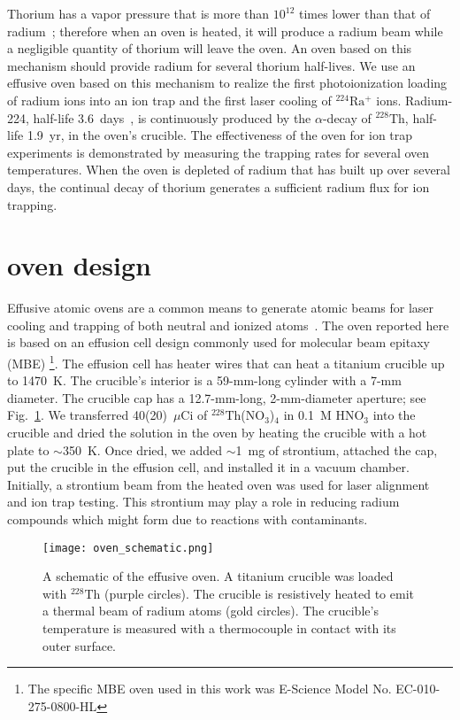 \documentclass[
 reprint,
 amsmath,amssymb,
 aps,
 prr,
 superscriptaddress,
]{revtex4-2}
\newcommand{\iso}[2]{\ensuremath{^{#2}\mathrm{#1}}}
\begin{document}
Thorium has a vapor pressure that is more than $10^{12}$ times lower than that of radium~\cite{haynes2015}; therefore when an oven is heated, it will produce a radium beam while a negligible quantity of thorium will leave the oven. An oven based on this mechanism should provide radium for several thorium half-lives. We use an effusive oven based on this mechanism to realize the first photoionization loading of radium ions into an ion trap and the first laser cooling of \iso{Ra}{224}$^+$ ions.  Radium-224, half-life 3.6~days~\cite{Bergeron2021}, is continuously produced by the $\alpha$-decay of \iso{Th}{228}, half-life 1.9~yr, in the oven's crucible.  The effectiveness of the oven for ion trap experiments is demonstrated by measuring the trapping rates for several oven temperatures. When the oven is depleted of radium that has built up over several days, the continual decay of thorium generates a sufficient radium flux for ion trapping.


\section{oven design}

Effusive atomic ovens are a common means to generate atomic beams for laser cooling and trapping of both neutral and ionized atoms~\cite{Ross1995,Dammalapati2009}. The oven reported here is based on an effusion cell design commonly used for molecular beam epitaxy (MBE) \footnote{The specific MBE oven used in this work was E-Science Model No. EC-010-275-0800-HL}. The effusion cell has heater wires that can heat a titanium crucible up to 1470~K. The crucible's interior is a 59-mm-long cylinder with a 7-mm diameter. The crucible cap has a 12.7-mm-long, 2-mm-diameter aperture; see Fig.~\ref{fig:oven-schematic}. We transferred 40(20)~$\mu$Ci of \iso{Th}{228}(NO$_3$)$_4$ in 0.1~M HNO$_3$ into the crucible and dried the solution in the oven by heating the crucible with a hot plate to $\sim$350~K. Once dried, we added $\sim$1~mg of strontium, attached the cap, put the crucible in the effusion cell, and installed it in a vacuum chamber.   Initially, a strontium beam from the heated oven was used for laser alignment and ion trap testing.  This strontium may play a role in reducing radium compounds which might form due to reactions with contaminants.

\begin{figure}
    \centering
    \texttt{[image: oven\_schematic.png]}
    \caption{A schematic of the effusive oven. A titanium crucible was loaded with \iso{Th}{228} (purple circles). The crucible is resistively heated to emit a thermal beam of radium atoms (gold circles). The crucible's temperature is measured with a thermocouple in contact with its outer surface.}
    \label{fig:oven-schematic}
\end{figure}
\end{document}

